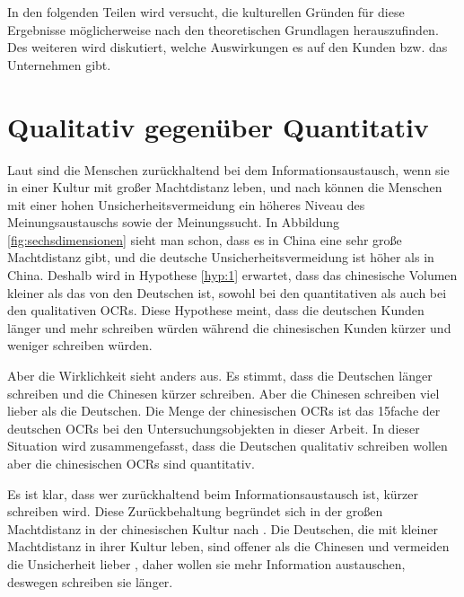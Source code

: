 In den folgenden Teilen wird versucht, die kulturellen Gründen für diese Ergebnisse möglicherweise nach den theoretischen Grundlagen herauszufinden. Des weiteren wird diskutiert, welche Auswirkungen es auf den Kunden \ac{bzw.} das Unternehmen gibt.
\section{Qualitativ gegenüber Quantitativ}
Laut \citet{Lam2009} sind die Menschen zurückhaltend bei dem Informationsaustausch, wenn sie in einer Kultur mit großer Machtdistanz leben, und nach \citet{Lam2009, liu2001relationships, dawar1996cross, money1998explorations} können die Menschen mit einer hohen Unsicherheitsvermeidung ein höheres Niveau des Meinungsaustauschs sowie der Meinungssucht. In Abbildung \ref{fig:sechsdimensionen} sieht man schon, dass es in China eine sehr große Machtdistanz gibt, und die deutsche Unsicherheitsvermeidung ist höher als in China. Deshalb wird in Hypothese \ref{hyp:1} erwartet, dass das chinesische Volumen kleiner als das von den Deutschen ist, sowohl bei den quantitativen als auch bei den qualitativen \ac{OCRs}. Diese Hypothese meint, dass die deutschen Kunden länger und mehr schreiben würden während die chinesischen Kunden kürzer und weniger schreiben würden.

Aber die Wirklichkeit sieht anders aus. Es stimmt, dass die Deutschen länger schreiben und die Chinesen kürzer schreiben. Aber die Chinesen schreiben viel lieber als die Deutschen. Die Menge der chinesischen \ac{OCRs} ist das 15fache der deutschen \ac{OCRs} bei den Untersuchungsobjekten in dieser Arbeit. In dieser Situation wird zusammengefasst, dass die Deutschen qualitativ schreiben wollen aber die chinesischen \ac{OCRs} sind quantitativ.

Es ist klar, dass wer zurückhaltend beim Informationsaustausch ist, kürzer schreiben wird. Diese Zurückbehaltung begründet sich in der großen Machtdistanz in der chinesischen Kultur nach \citet{Lam2009}. Die Deutschen, die mit kleiner Machtdistanz in ihrer Kultur leben, sind offener als die Chinesen und vermeiden die Unsicherheit lieber \citep{Lam2009, liu2001relationships, dawar1996cross, money1998explorations}, daher wollen sie mehr Information austauschen, deswegen schreiben sie länger.


